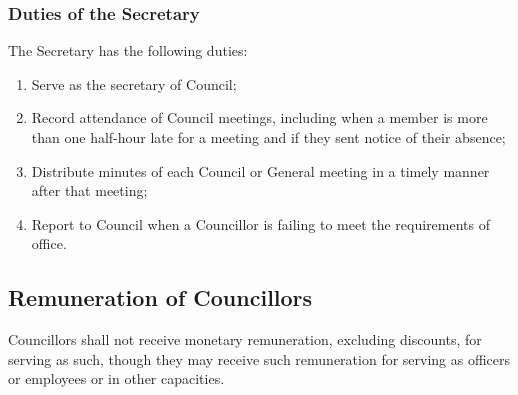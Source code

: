 \subsubsection{Duties of the Secretary}
The Secretary has the following duties:
\begin{enumerate}
  \item Serve as the secretary of Council;
  \item Record attendance of Council meetings, including when a
      member is more than one half-hour late for a meeting and if they sent
      notice of their absence;
  \item Distribute minutes of each Council or General meeting in a
      timely manner after that meeting;
  \item Report to Council when a Councillor is failing to meet the
      requirements of office.
\end{enumerate}

\subsection{Remuneration of Councillors}

Councillors shall not receive monetary remuneration, excluding discounts, 
for serving as such, though they may receive such remuneration for serving 
as officers or employees or in other capacities.
